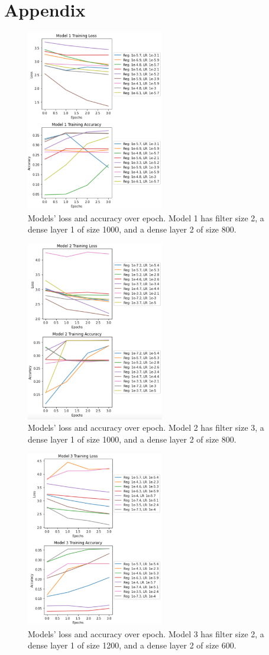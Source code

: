 \documentclass[10pt,twocolumn,letterpaper]{article}
\begin{document}
\section{Appendix}



\begin{figure}[!htb]

    \centering
    \includegraphics[width=6cm]{latex/figs/model1.png}
    \caption{Models' loss and accuracy over epoch. Model 1 has filter size 2, a dense layer 1 of size 1000, and a dense layer 2 of size 800. }
    \label{fig:model1}
\end{figure}
\begin{figure}[!htb]

    \centering
    \includegraphics[width=6cm]{latex/figs/model2.png}
    \caption{Models' loss and accuracy over epoch. Model 2 has filter size 3, a dense layer 1 of size 1000, and a dense layer 2 of size 800. }
    \label{fig:model2}
\end{figure}
\begin{figure}
    \centering

    \includegraphics[width=6cm]{latex/figs/model3.png}
    \caption{Models' loss and accuracy over epoch. Model 3 has filter size 2, a dense layer 1 of size 1200, and a dense layer 2 of size 600.}
    \label{fig:model3}
\end{figure}
\end{document}
